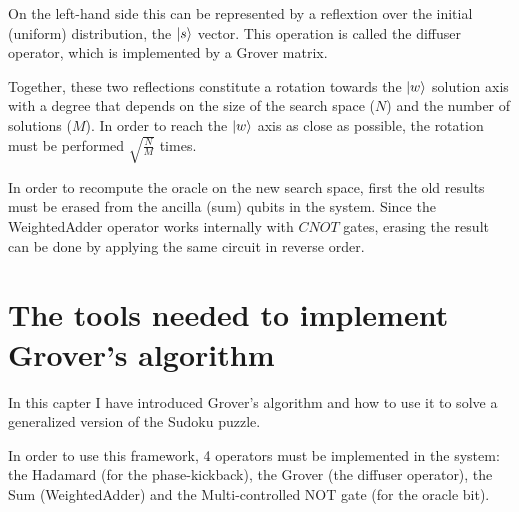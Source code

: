 On the left-hand side this can be represented by a reflextion over the initial (uniform) distribution, the $\ket{s}$ vector. This operation is called the diffuser operator, which is implemented by a Grover matrix.

Together, these two reflections constitute a rotation towards the $\ket{w}$ solution axis with a degree that depends on the size of the search space ($N$) and the number of solutions ($M$). In order to reach the $\ket{w}$ axis as close as possible, the rotation must be performed $\sqrt{\frac{N}{M}}$ times.

In order to recompute the oracle on the new search space, first the old results must be erased from the ancilla (sum) qubits in the system. Since the WeightedAdder operator works internally with $CNOT$ gates, erasing the result can be done by applying the same circuit in reverse order.

\section{The tools needed to implement Grover's algorithm}

In this capter I have introduced Grover's algorithm and how to use it to solve a generalized version of the Sudoku puzzle.

In order to use this framework, 4 operators must be implemented in the system: the Hadamard (for the phase-kickback), the Grover (the diffuser operator), the Sum (WeightedAdder) and the Multi-controlled NOT gate (for the oracle bit).
